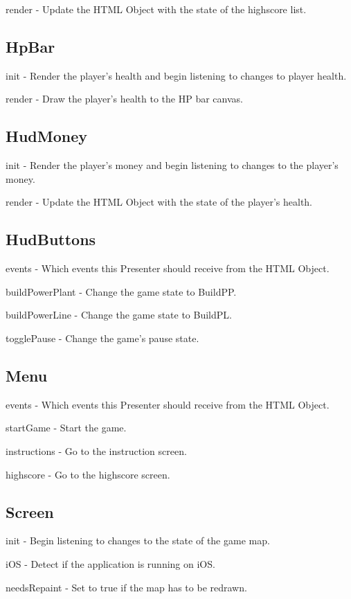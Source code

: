 	render - Update the HTML Object with the state of the highscore list.

\subsection*{HpBar}
	init - Render the player's health and begin listening to changes to player health.

	render - Draw the player's health to the HP bar canvas.

\subsection*{HudMoney}
	init - Render the player's money and begin listening to changes to the player's money.

	render - Update the HTML Object with the state of the player's health.

\subsection*{HudButtons}

	events - Which events this Presenter should receive from the HTML Object.

	buildPowerPlant - Change the game state to BuildPP.

	buildPowerLine - Change the game state to BuildPL.

	togglePause - Change the game's pause state.

\subsection*{Menu}

	events - Which events this Presenter should receive from the HTML Object.

	startGame - Start the game.

	instructions - Go to the instruction screen.

	highscore - Go to the highscore screen.

\subsection*{Screen}

	init - Begin listening to changes to the state of the game map.

	iOS - Detect if the application is running on iOS.

	needsRepaint - Set to true if the map has to be redrawn.

